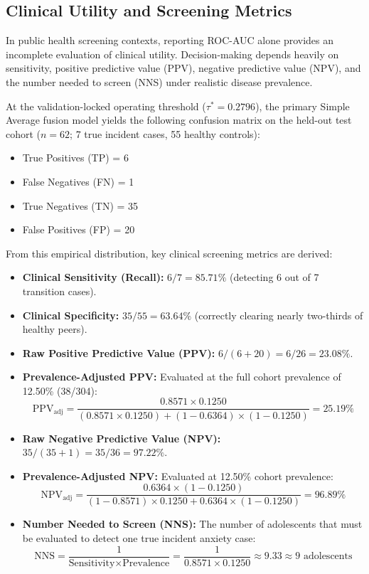 \documentclass[10pt,letterpaper]{article}
\begin{document}
\subsection*{Clinical Utility and Screening Metrics}

In public health screening contexts, reporting ROC-AUC alone provides an incomplete evaluation of clinical utility. Decision-making depends heavily on sensitivity, positive predictive value (PPV), negative predictive value (NPV), and the number needed to screen (NNS) under realistic disease prevalence.

At the validation-locked operating threshold ($\tau^* = 0.2796$), the primary Simple Average fusion model yields the following confusion matrix on the held-out test cohort ($n=62$; 7 true incident cases, 55 healthy controls):
\begin{itemize}
    \item True Positives (TP) = 6
    \item False Negatives (FN) = 1
    \item True Negatives (TN) = 35
    \item False Positives (FP) = 20
\end{itemize}

From this empirical distribution, key clinical screening metrics are derived:
\begin{itemize}
    \item \textbf{Clinical Sensitivity (Recall):} $6 / 7 = 85.71\%$ (detecting 6 out of 7 transition cases).
    \item \textbf{Clinical Specificity:} $35 / 55 = 63.64\%$ (correctly clearing nearly two-thirds of healthy peers).
    \item \textbf{Raw Positive Predictive Value (PPV):} $6 / (6 + 20) = 6 / 26 = 23.08\%$.
    \item \textbf{Prevalence-Adjusted PPV:} Evaluated at the full cohort prevalence of 12.50\% (38/304):
    \begin{equation} \label{eq:adj_ppv}
    \text{PPV}_{\text{adj}} = \frac{0.8571 \times 0.1250}{(0.8571 \times 0.1250) + (1 - 0.6364) \times (1 - 0.1250)} = 25.19\%
    \end{equation}
    \item \textbf{Raw Negative Predictive Value (NPV):} $35 / (35 + 1) = 35 / 36 = 97.22\%$.
    \item \textbf{Prevalence-Adjusted NPV:} Evaluated at 12.50\% cohort prevalence:
    \begin{equation} \label{eq:adj_npv}
    \text{NPV}_{\text{adj}} = \frac{0.6364 \times (1 - 0.1250)}{(1 - 0.8571) \times 0.1250 + 0.6364 \times (1 - 0.1250)} = 96.89\%
    \end{equation}
    \item \textbf{Number Needed to Screen (NNS):} The number of adolescents that must be evaluated to detect one true incident anxiety case:
    \begin{equation} \label{eq:nns}
    \text{NNS} = \frac{1}{\text{Sensitivity} \times \text{Prevalence}} = \frac{1}{0.8571 \times 0.1250} \approx 9.33 \approx 9 \text{ adolescents}
    \end{equation}
\end{itemize}
\end{document}

